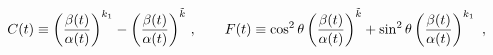 \begin{equation}
C(t) \equiv \left({\beta(t)\over\alpha(t)}\right)^{k_1}
-\left({\beta(t)\over\alpha(t)}\right)^{{\tilde{k}}}\,,\qquad
F(t)\equiv
\cos^2\theta\left({\beta(t)\over\alpha(t)}\right)^{{\tilde{k}}}
+\sin^2\theta\left({\beta(t)\over\alpha(t)}\right)^{k_1} \ ,
\label{useful}
\end{equation}

